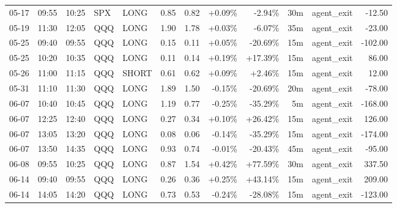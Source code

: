 \documentclass[11pt,a4paper]{article}
\begin{document}
\begin{center}
\begin{longtable}{>{\color{txtmain}}l l l l l r r r r r >{\color{txtmain}}l r}
05-17 & 09:55 & 10:25 & SPX & LONG & 0.85 & 0.82 & \textcolor{wingreen}{+0.09\%} & \textcolor{lossred}{-2.94\%} & 30m & agent\_exit & \textcolor{lossred}{-12.50} \\
05-19 & 11:30 & 12:05 & QQQ & LONG & 1.90 & 1.78 & \textcolor{wingreen}{+0.03\%} & \textcolor{lossred}{-6.07\%} & 35m & agent\_exit & \textcolor{lossred}{-23.00} \\
05-25 & 09:40 & 09:55 & QQQ & LONG & 0.15 & 0.11 & \textcolor{wingreen}{+0.05\%} & \textcolor{lossred}{-20.69\%} & 15m & agent\_exit & \textcolor{lossred}{-102.00} \\
05-25 & 10:20 & 10:35 & QQQ & LONG & 0.11 & 0.14 & \textcolor{wingreen}{+0.19\%} & \textcolor{wingreen}{+17.39\%} & 15m & agent\_exit & \textcolor{wingreen}{86.00} \\
05-26 & 11:00 & 11:15 & QQQ & SHORT & 0.61 & 0.62 & \textcolor{wingreen}{+0.09\%} & \textcolor{wingreen}{+2.46\%} & 15m & agent\_exit & \textcolor{wingreen}{12.00} \\
05-31 & 11:10 & 11:30 & QQQ & LONG & 1.89 & 1.50 & \textcolor{lossred}{-0.15\%} & \textcolor{lossred}{-20.69\%} & 20m & agent\_exit & \textcolor{lossred}{-78.00} \\
06-07 & 10:40 & 10:45 & QQQ & LONG & 1.19 & 0.77 & \textcolor{lossred}{-0.25\%} & \textcolor{lossred}{-35.29\%} & 5m & agent\_exit & \textcolor{lossred}{-168.00} \\
06-07 & 12:25 & 12:40 & QQQ & LONG & 0.27 & 0.34 & \textcolor{wingreen}{+0.10\%} & \textcolor{wingreen}{+26.42\%} & 15m & agent\_exit & \textcolor{wingreen}{126.00} \\
06-07 & 13:05 & 13:20 & QQQ & LONG & 0.08 & 0.06 & \textcolor{lossred}{-0.14\%} & \textcolor{lossred}{-35.29\%} & 15m & agent\_exit & \textcolor{lossred}{-174.00} \\
06-07 & 13:50 & 14:35 & QQQ & LONG & 0.93 & 0.74 & \textcolor{lossred}{-0.01\%} & \textcolor{lossred}{-20.43\%} & 45m & agent\_exit & \textcolor{lossred}{-95.00} \\
06-08 & 09:55 & 10:25 & QQQ & LONG & 0.87 & 1.54 & \textcolor{wingreen}{+0.42\%} & \textcolor{wingreen}{+77.59\%} & 30m & agent\_exit & \textcolor{wingreen}{337.50} \\
06-14 & 09:40 & 09:55 & QQQ & LONG & 0.26 & 0.36 & \textcolor{wingreen}{+0.25\%} & \textcolor{wingreen}{+43.14\%} & 15m & agent\_exit & \textcolor{wingreen}{209.00} \\
06-14 & 14:05 & 14:20 & QQQ & LONG & 0.73 & 0.53 & \textcolor{lossred}{-0.24\%} & \textcolor{lossred}{-28.08\%} & 15m & agent\_exit & \textcolor{lossred}{-123.00} \\

\end{longtable}
\end{center}
\end{document}
